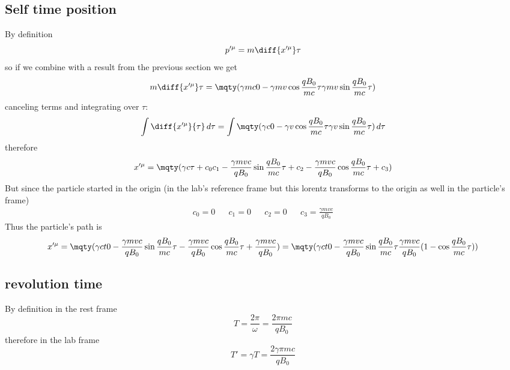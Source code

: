 \subsection{Self time position}
By definition
\begin{equation}
  p'^\mu = m \diff {x'^\mu}\tau
\end{equation}
so if we combine with a result from the previous section we get
\begin{equation}
  m \diff {x'^\mu}\tau = \mqty(\gamma mc\\0\\-\gamma mv\cos{\frac{qB_0}{mc}\tau}\\\gamma mv\sin{\frac{qB_0}{mc}\tau})
\end{equation}
canceling terms and integrating over $\tau$:
\begin{equation}
  \int \diff {x'^\mu}{\tau} \,d\tau = \int \mqty(\gamma c\\0\\-\gamma v\cos{\frac{qB_0}{mc}\tau}\\\gamma v\sin{\frac{qB_0}{mc}\tau}) \,d\tau\\
\end{equation}
therefore
\begin{equation}
  x'^\mu = \mqty(\gamma c \tau+c_0\\c_1\\-\frac{\gamma mvc}{qB_0}\sin{\frac{qB_0}{mc}\tau}+c_2\\-\frac{\gamma mvc}{qB_0}\cos{\frac{qB_0}{mc}\tau + c_3})
\end{equation}
But since the particle started in the origin (in the lab's reference frame but this lorentz transforms to the origin as well in the particle's frame)
\begin{align}
	c_0=0 && c_1=0 &&c_2=0 &&c_3=\frac{\gamma mvc}{qB_0}
\end{align}
Thus the particle's path is
\begin{equation}
  x'^\mu=\mqty(\gamma ct\\0\\-\frac{\gamma mvc}{qB_0}\sin{\frac{qB_0}{mc}\tau}\\-\frac{\gamma mvc}{qB_0}\cos{\frac{qB_0}{mc}\tau + \frac{\gamma mvc}{qB_0}}) = \mqty(\gamma ct\\0\\-\frac{\gamma mvc}{qB_0}\sin{\frac{qB_0}{mc}\tau}\\\frac{\gamma mvc}{qB_0}(1-\cos{\frac{qB_0}{mc}\tau}))
\end{equation}
\subsection{revolution time}
By definition in the rest frame 
\begin{equation}
  T = \frac{2\pi}{\omega} = \frac{2\pi mc}{qB_0}
\end{equation}
therefore in the lab frame
\begin{equation}
  T' = \gamma T = \frac{2\gamma\pi mc}{qB_0}
\end{equation}
